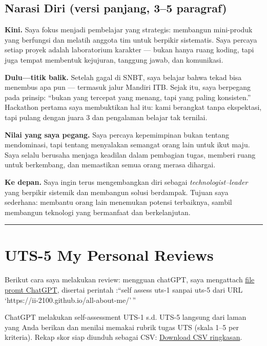 \documentclass[
  letterpaper,
  DIV=11,
  numbers=noendperiod]{scrreprt}
\begin{document}
\section{Narasi Diri (versi panjang, 3--5
paragraf)}\label{narasi-diri-versi-panjang-35-paragraf}

\textbf{Kini.} Saya fokus menjadi pembelajar yang strategis: membangun
mini-produk yang berfungsi dan melatih anggota tim untuk berpikir
sistematis. Saya percaya setiap proyek adalah laboratorium karakter ---
bukan hanya ruang koding, tapi juga tempat membentuk kejujuran, tanggung
jawab, dan komunikasi.

\textbf{Dulu---titik balik.} Setelah gagal di SNBT, saya belajar bahwa
tekad bisa menembus apa pun --- termasuk jalur Mandiri ITB. Sejak itu,
saya berpegang pada prinsip: ``bukan yang tercepat yang menang, tapi
yang paling konsisten.'' Hackathon pertama saya membuktikan hal itu:
kami berangkat tanpa ekspektasi, tapi pulang dengan juara 3 dan
pengalaman belajar tak ternilai.

\textbf{Nilai yang saya pegang.} Saya percaya kepemimpinan bukan tentang
mendominasi, tapi tentang menyalakan semangat orang lain untuk ikut
maju. Saya selalu berusaha menjaga keadilan dalam pembagian tugas,
memberi ruang untuk berkembang, dan memastikan semua orang merasa
dihargai.

\textbf{Ke depan.} Saya ingin terus mengembangkan diri sebagai
\emph{technologist--leader} yang berpikir sistemik dan membangun solusi
berdampak. Tujuan saya sederhana: membantu orang lain menemukan potensi
terbaiknya, sambil membangun teknologi yang bermanfaat dan
berkelanjutan.

\begin{center}\rule{0.5\linewidth}{0.5pt}\end{center}


\chapter{UTS-5 My Personal Reviews}\label{uts-5-my-personal-reviews}

Berikut cara saya melakukan review: mengguan chatGPT, saya mengattach
\href{skor_uts.pdf}{file promt ChatGPT}, disertai perintah :``self
assess uts-1 sanpai uts-5 dari URL
`https://ii-2100.github.io/all-about-me/'\,''

ChatGPT melakukan self-assessment UTS-1 s.d. UTS-5 langsung dari laman
yang Anda berikan dan menilai memakai rubrik tugas UTS (skala 1--5 per
kriteria). Rekap skor siap diunduh sebagai CSV:
\href{sandbox:/mnt/data/UTS_self_assessment.csv}{Download CSV
ringkasan}.
\end{document}
